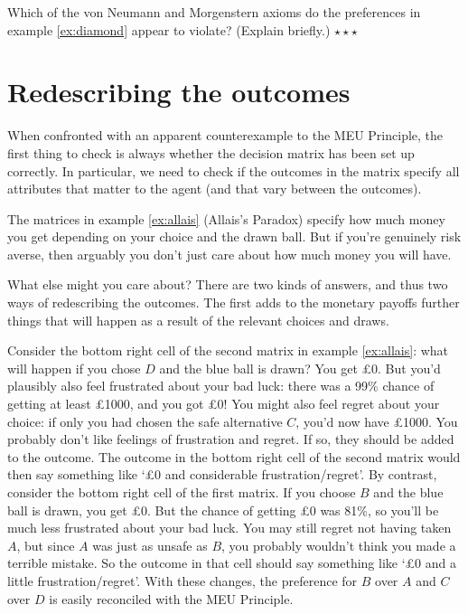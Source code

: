 \begin{exercise}
  Which of the von Neumann and Morgenstern axioms do the preferences
  in example \ref{ex:diamond} appear to violate? (Explain briefly.)
  $\star \star \star$
\end{exercise}


\section{Redescribing the outcomes}

When confronted with an apparent counterexample to the MEU Principle,
the first thing to check is always whether the decision matrix has
been set up correctly. In particular, we need to check if the outcomes
in the matrix specify all attributes that matter to the agent (and
that vary between the outcomes).

The matrices in example \ref{ex:allais} (Allais's Paradox) specify how
much money you get depending on your choice and the drawn ball. But if
you're genuinely risk averse, then arguably you don't just care about
how much money you will have. 

What else might you care about? There are two kinds of answers, and
thus two ways of redescribing the outcomes. The first adds to the
monetary payoffs further things that will happen as a result of the
relevant choices and draws.

Consider the bottom right cell of the second matrix in example
\ref{ex:allais}: what will happen if you chose $D$ and the blue ball
is drawn? You get £0. But you'd plausibly also feel frustrated about
your bad luck: there was a 99\% chance of getting at least £1000, and
you got £0! You might also feel regret about your choice: if only you
had chosen the safe alternative $C$, you'd now have £1000. You
probably don't like feelings of frustration and regret. If so, they
should be added to the outcome. The outcome in the bottom right cell
of the second matrix would then say something like `£0 and
considerable frustration/regret'. By contrast, consider the bottom
right cell of the first matrix. If you choose $B$ and the blue ball is
drawn, you get £0. But the chance of getting £0 was 81\%, so you'll be
much less frustrated about your bad luck. You may still regret not
having taken $A$, but since $A$ was just as unsafe as $B$, you
probably wouldn't think you made a terrible mistake. So the outcome in
that cell should say something like `£0 and a little
frustration/regret'. With these changes, the preference for $B$ over
$A$ and $C$ over $D$ is easily reconciled with the MEU Principle.

